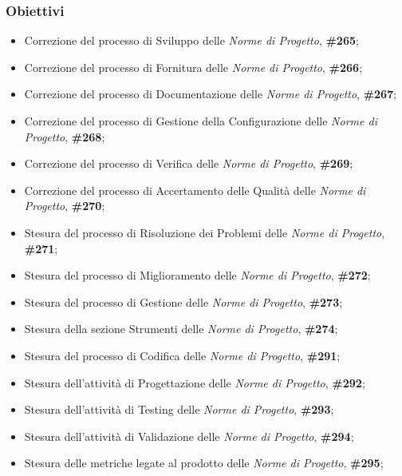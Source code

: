\subsubsection{Obiettivi}
\label{sec:obiettivi_sprint9}

\begin{itemize}
        \item Correzione del processo di Sviluppo delle \textit{Norme di Progetto},  \textbf{\#265};
        \item Correzione del processo di Fornitura delle \textit{Norme di Progetto},  \textbf{\#266};
        \item Correzione del processo di Documentazione delle \textit{Norme di Progetto},  \textbf{\#267}; 
        \item Correzione del processo di Gestione della Configurazione delle \textit{Norme di Progetto},  \textbf{\#268};
        \item Correzione del processo di Verifica delle \textit{Norme di Progetto},  \textbf{\#269};
        \item Correzione del processo di Accertamento delle Qualità delle \textit{Norme di Progetto},  \textbf{\#270};
        \item Stesura del processo di Risoluzione dei Problemi delle \textit{Norme di Progetto},  \textbf{\#271};
        \item Stesura del processo di Miglioramento delle \textit{Norme di Progetto},  \textbf{\#272};
        \item Stesura del processo di Gestione delle \textit{Norme di Progetto},  \textbf{\#273};
        \item Stesura della sezione Strumenti delle \textit{Norme di Progetto},  \textbf{\#274};
        \item Stesura del processo di Codifica delle \textit{Norme di Progetto},  \textbf{\#291};
        \item Stesura dell'attività di Progettazione delle \textit{Norme di Progetto},  \textbf{\#292};
        \item Stesura dell'attività di Testing delle \textit{Norme di Progetto},  \textbf{\#293};
        \item Stesura dell'attività di Validazione delle \textit{Norme di Progetto},  \textbf{\#294};
        \item Stesura delle metriche legate al prodotto delle \textit{Norme di Progetto},  \textbf{\#295};

\end{itemize}
